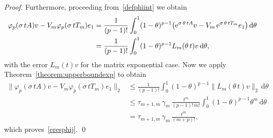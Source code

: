 \documentclass[smallextended]{svjour3pre}%
\numberwithin{equation}{section}
\numberwithin{figure}{section}
\numberwithin{table}{section}
\newcommand{\C}{\mathbb C}%
\newcommand\phif\varphi
\newcommand{\dd}{\mathrm{d}}
\newcommand{\ee}{{\rm e}}
\newcommand\sca{\sigma}
\newcommand\Opgen{A}
\begin{document}
\begin{proof}
Furthermore, proceeding from~\eqref{defphiint} we obtain
\begin{align*}
\phif_p(\sca\,t \Opgen)v - V_m \phif_p(\sca\,t T_m) e_1
&= \frac{1}{(p-1)!} \int_0^1 (1-\theta)^{p-1}\big( \ee^{\sca\,\theta\,t \Opgen} v - V_m\,\ee^{\sca\,\theta\,t T_m} e_1 \big) \,\dd \theta\\
&= \frac{1}{(p-1)!} \int_0^1 (1-\theta)^{p-1} L_m(\theta\,t)v \,\dd \theta,
\end{align*}
with the error $L_m(t)v$ for the matrix exponential case.
Now we apply Theorem~\ref{theorem:upperboundexp} to obtain
\begin{align*}
\| \phif_p(\sca\,t \Opgen)v - V_m \phif_p(\sca\,t T_m) e_1 \|_2
&\leq \frac{1}{(p-1)!} \int_0^1 (1-\theta)^{p-1}  \|L_m(\theta\,t)v\|_2 \,\dd \theta\\
&\leq \tau_{m+1,m}\,\gamma_m\,\frac{t^m}{(p-1)!\,m!} \int_0^1 (1-\theta)^{p-1} \theta^m \,\dd \theta\\
&= \tau_{m+1,m}\,\gamma_m\,\frac{t^{m}}{(m+p)!},
\end{align*}
which proves~\eqref{eresphij}. \qed

\end{proof}
\end{document}
